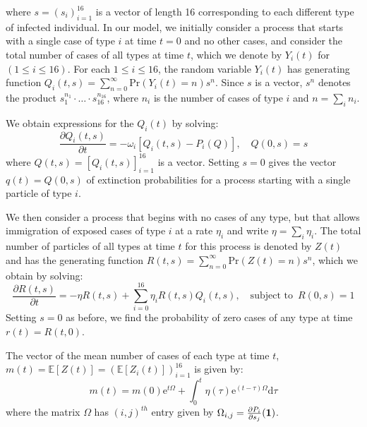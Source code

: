 \documentclass{article}
\begin{document}
where $s = (s_i)_{i=1}^{16}$ is a vector of length 16 corresponding to each different type of infected individual. In our model, we initially consider a process that starts with a single case of type $i$ at time $t=0$ and no other cases, and consider the total number of cases of all types at time $t$, which we denote by $Y_i(t)$ for $ (1 \leq i \leq 16)$.  For each $1 \leq i \leq 16$, the random variable $Y_i(t)$ has generating function $Q_i(t, s) = \sum_{n=0}^\infty{\mathrm{Pr}}(Y_i(t) = n)s^n$. Since $s$ is a vector, $s^n$ denotes the product $s_1^{n_1} \cdot \dots \cdot s_{16}^{n_{16}}$, where $n_i$ is the number of cases of type $i$ and $n = \sum_i n_i$.

We obtain expressions for the $Q_i(t)$ by solving:
\begin{equation}
    \frac{\partial Q_i(t, s)}{\partial t} = -\omega_i[Q_i(t, s) - P_i(Q)], \quad Q(0, s) = s \label{Qeq}
\end{equation}
where $Q(t, s) = [Q_i(t, s)]_{i=1}^{16}$ is a vector. Setting $s=0$ gives the vector  $q(t) = Q(0, s)$ of extinction probabilities for a process starting with a single particle of type $i$. 

We then consider a process that begins with no cases of any type, but that allows immigration of exposed cases of type $i$ at a rate $\eta_i$ and write $\eta = \sum_i \eta_i$. The total number of particles of all types at time $t$ for this process is denoted by $Z(t)$ and has the generating function $R(t, s) = \sum_{n=0}^\infty {\mathrm{Pr}}(Z(t) = n)s^n$, which we obtain by solving:
\begin{equation}
    \frac{\partial R(t, s)}{\partial t} = -\eta R(t, s) + \sum_{i=0}^{16} \eta_i R(t, s)Q_i(t, s), \quad \text{subject to }\, R(0, s) = 1 \label{Req}
\end{equation}
Setting $s=0$ as before, we find the probability of zero cases of any type at time $r(t) = R(t, 0)$.  

The vector of the mean number of cases of each type at time $t$, $m(t) = {\mathbb{E}}[Z(t)] = ({\mathbb{E}}[Z_i(t)])_{i=1}^{16}$ is given by:
\begin{equation}
m(t) = m(0){\mathrm{e}}^{t\Omega} + \int_0^t \eta(\tau){\mathrm{e}}^{(t-\tau)\Omega} {\mathrm{d}}\tau 
\end{equation}
where the matrix $\Omega$ has $(i, j)^{th}$ entry given by $\Omega_{i, j} = \frac{\partial P_i}{\partial s_j}({\vb{1}})$. 
\end{document}
